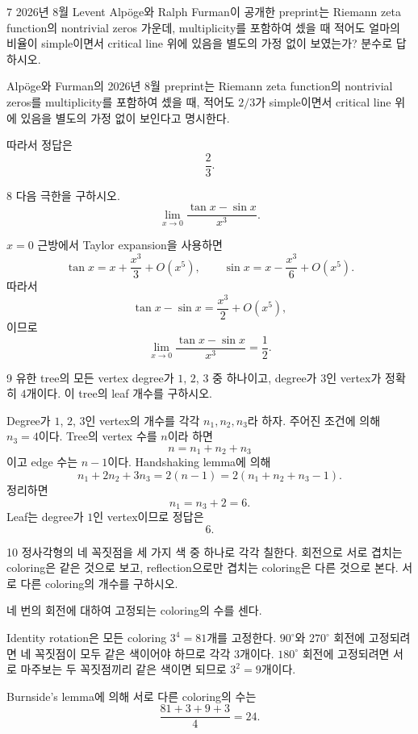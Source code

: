 \begin{problem}{7}
2026년 8월 Levent Alp\"oge와 Ralph Furman이 공개한 preprint는 Riemann zeta function의 nontrivial zeros 가운데, multiplicity를 포함하여 셌을 때 적어도 얼마의 비율이 simple이면서 critical line 위에 있음을 별도의 가정 없이 보였는가? 분수로 답하시오.
\end{problem}

\begin{solution}
Alp\"oge와 Furman의 2026년 8월 preprint는 Riemann zeta function의 nontrivial zeros를 multiplicity를 포함하여 셌을 때, 적어도 $2/3$가 simple이면서 critical line 위에 있음을 별도의 가정 없이 보인다고 명시한다.

따라서 정답은
\[
    \boxed{\frac23}.
\]
\end{solution}

\begin{problem}{8}
다음 극한을 구하시오.
\[
    \lim_{x\to0}
    \frac{\tan x-\sin x}{x^3}.
\]
\end{problem}

\begin{solution}
$x=0$ 근방에서 Taylor expansion을 사용하면
\[
    \tan x
    =x+\frac{x^3}{3}+O(x^5),
    \qquad
    \sin x
    =x-\frac{x^3}{6}+O(x^5).
\]
따라서
\[
    \tan x-\sin x
    =\frac{x^3}{2}+O(x^5),
\]
이므로
\[
    \boxed{
        \lim_{x\to0}
        \frac{\tan x-\sin x}{x^3}
        =\frac12
    }.
\]
\end{solution}

\begin{problem}{9}
유한 tree의 모든 vertex degree가 $1$, $2$, $3$ 중 하나이고, degree가 $3$인 vertex가 정확히 $4$개이다. 이 tree의 leaf 개수를 구하시오.
\end{problem}

\begin{solution}
Degree가 $1$, $2$, $3$인 vertex의 개수를 각각 $n_1,n_2,n_3$라 하자. 주어진 조건에 의해 $n_3=4$이다. Tree의 vertex 수를 $n$이라 하면
\[
    n=n_1+n_2+n_3
\]
이고 edge 수는 $n-1$이다. Handshaking lemma에 의해
\[
    n_1+2n_2+3n_3
    =2(n-1)
    =2(n_1+n_2+n_3-1).
\]
정리하면
\[
    n_1=n_3+2=6.
\]
Leaf는 degree가 $1$인 vertex이므로 정답은
\[
    \boxed{6}.
\]
\end{solution}

\begin{problem}{10}
정사각형의 네 꼭짓점을 세 가지 색 중 하나로 각각 칠한다. 회전으로 서로 겹치는 coloring은 같은 것으로 보고, reflection으로만 겹치는 coloring은 다른 것으로 본다. 서로 다른 coloring의 개수를 구하시오.
\end{problem}

\begin{solution}
네 번의 회전에 대하여 고정되는 coloring의 수를 센다.

Identity rotation은 모든 coloring $3^4=81$개를 고정한다. $90^\circ$와 $270^\circ$ 회전에 고정되려면 네 꼭짓점이 모두 같은 색이어야 하므로 각각 $3$개이다. $180^\circ$ 회전에 고정되려면 서로 마주보는 두 꼭짓점끼리 같은 색이면 되므로 $3^2=9$개이다.

Burnside's lemma에 의해 서로 다른 coloring의 수는
\[
    \frac{81+3+9+3}{4}
    =\boxed{24}.
\]
\end{solution}
